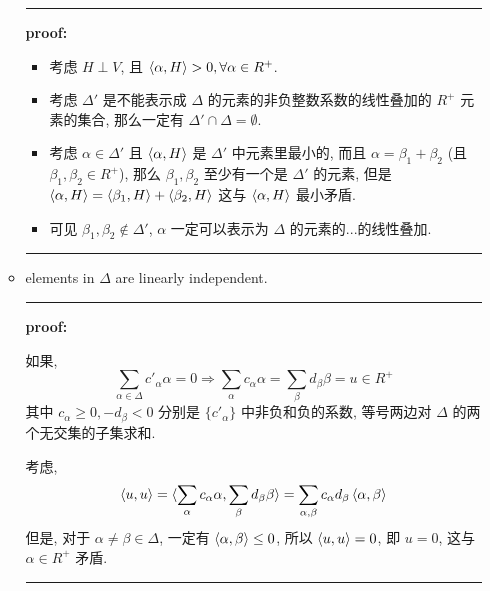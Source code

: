 \begin{itemize}
\begin{tcolorbox}[title=proof:]
\begin{itemize}
			\noindent\rule[0.5ex]{\linewidth}{0.5pt} %
			
			\textbf{proof:}
			
			\begin{itemize}
				\item 考虑 $H \perp V$, 且 $\braket{\alpha, H} > 0, \forall \alpha \in R^+$.
				
				\item 考虑 $\Delta'$ 是不能表示成 $\Delta$ 的元素的非负整数系数的线性叠加的 $R^+$ 元素的集合, 那么一定有 $\Delta' \cap \Delta = \emptyset$.
				
				\item 考虑 $\alpha \in \Delta'$ 且 $\braket{\alpha, H}$ 是 $\Delta'$ 中元素里最小的, 而且 $\alpha = \beta_1 + \beta_2$ (且 $\beta_1, \beta_2 \in R^+$), 那么 $\beta_1, \beta_2$ 至少有一个是 $\Delta'$ 的元素, 但是 $\braket{\alpha, H} = \braket{\beta_1, H} + \braket{\beta_2, H}$ 这与 $\braket{\alpha, H}$ 最小矛盾.
				
				\item 可见 $\beta_1, \beta_2 \notin \Delta'$, $\alpha$ 一定可以表示为 $\Delta$ 的元素的...的线性叠加.
			\end{itemize}
			
			\noindent\rule[0.5ex]{\linewidth}{0.5pt} %
			
			\item elements in $\Delta$ are linearly independent.
			
			\noindent\rule[0.5ex]{\linewidth}{0.5pt} %
			
			\textbf{proof:}
			
			如果,
			\begin{equation}
				\sum_{\alpha \in \Delta} c'_\alpha \alpha = 0 \Longrightarrow \sum_\alpha c_\alpha \alpha = \sum_\beta d_\beta \beta = u \in R^+
			\end{equation}
			其中 $c_\alpha \geq 0, - d_\beta < 0$ 分别是 $\{c'_\alpha\}$ 中非负和负的系数, 等号两边对 $\Delta$ 的两个无交集的子集求和.
			
			考虑,
			\begin{equation}
				\braket{u, u} = \braket{\sum_\alpha c_\alpha \alpha, \sum_\beta d_\beta \beta} = \sum_{\alpha, \beta} c_\alpha d_\beta \braket{\alpha, \beta}
			\end{equation}
			但是, 对于 $\alpha \neq \beta \in \Delta$, 一定有 $\braket{\alpha, \beta} \leq 0$, 所以 $\braket{u, u} = 0$, 即 $u = 0$, 这与 $\alpha \in R^+$ 矛盾.
			
			\noindent\rule[0.5ex]{\linewidth}{0.5pt} %
			

\end{itemize}
\end{tcolorbox}
\end{itemize}
